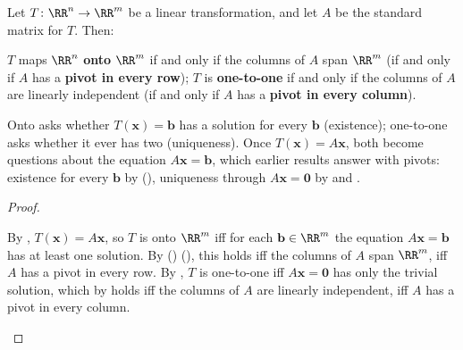 \documentclass[10pt]{scrartcl}
\newcommand{\vv}[1]{\mathbf{#1}}
\begin{document}
\begin{theorem*}
  Let $T\colon\RR^n\to\RR^m$ be a linear transformation, and let $A$ be the standard matrix for $T$. Then:
  \begin{enumerate}[(a)]
    \ii $T$ maps $\RR^n$ \textbf{onto} $\RR^m$ if and only if the columns of $A$ span $\RR^m$ (if and only if $A$ has a \textbf{pivot in every row});
    \ii $T$ is \textbf{one-to-one} if and only if the columns of $A$ are linearly independent (if and only if $A$ has a \textbf{pivot in every column}).
  \end{enumerate}
\end{theorem*}
\begin{ideabox}
  Onto asks whether $T(\vv x)=\vv b$ has a solution for every $\vv b$ (existence); one-to-one asks whether it ever has two (uniqueness). Once $T(\vv x)=A\vv x$, both become questions about the equation $A\vv x=\vv b$, which earlier results answer with pivots: existence for every $\vv b$ by (), uniqueness through $A\vv x=\vv 0$ by  and .
\end{ideabox}
\begin{proof}
  \begin{steps}
    \ii By , $T(\vv x)=A\vv x$, so $T$ is onto $\RR^m$ iff for each $\vv b\in\RR^m$ the equation $A\vv x=\vv b$ has at least one solution. By () (), this holds iff the columns of $A$ span $\RR^m$, iff $A$ has a pivot in every row.
    \ii By , $T$ is one-to-one iff $A\vv x=\vv 0$ has only the trivial solution, which by  holds iff the columns of $A$ are linearly independent, iff $A$ has a pivot in every column.
  \end{steps}
\end{proof}
\end{document}
